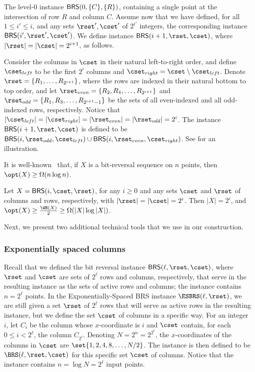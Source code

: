 The level-$0$  instance ${\sf BRS}(0,\{C\}, \{R\})$, containing a single point at the intersection of row $R$ and column $C$. 
Assume now that we have defined, for all $1\leq i'\leq i$, and any sets $\rset',\cset'$ of $2^{i'}$ integers, the corresponding instance ${\sf BRS}(i',\rset',\cset')$. We define  instance ${\sf BRS}(i+1,\rset,\cset)$, where $|\rset| = |\cset| = 2^{i+1}$, as follows. 

Consider the columns in $\cset$ in their natural left-to-right order, and define $\cset_{left}$ to be the first $2^i$ columns and $\cset_{right} = \cset \setminus \cset_{left}$. 
Denote $\rset= \{R_1,\ldots, R_{2^{i+1}}\}$, where the rows are indexed in their natural bottom to top order, and let $\rset_{even}=\{R_2,R_4,\ldots, R_{2^{i+1}}\}$ and $\rset_{odd}=\{R_1,R_3,\ldots, R_{2^{i+1}-1}\}$ be the sets of all even-indexed and all odd-indexed rows, respectively.
Notice that $|\cset_{left}| = |\cset_{right}| = |\rset_{even}| = |\rset_{odd}| = 2^i$. 
The instance ${\sf BRS}(i+1, \rset,\cset)$ is defined to be ${\sf BRS}(i,\rset_{odd},\cset_{left}) \cup {\sf BRS}(i,\rset_{even}, \cset_{right})$. 
See  for an illustration. 

%




It is well-known~\cite{wilber} that, if $X$ is a bit-reversal sequence on $n$ points, then $\opt(X)\geq \Omega(n \log n)$. 

\begin{claim}
\label{claim:BRS complexity} 
Let $X= {\sf BRS}(i,\cset,\rset)$, for any $i\geq 0$ and any sets $\cset$ and $\rset$ of columns and rows, respectively, with $|\rset|=|\cset|=2^i$. Then $|X| = 2^i$, and $\opt(X) \geq \frac{\WB(X)}{2} \geq \Omega(|X| \log |X|)$.  
\end{claim} 



%
%
%
%
%
%
%
%
%
Next, we present two additional technical tools that we use in our construction. 
 

\subsubsection{Exponentially spaced columns}


Recall that we defined the bit reversal instance ${\sf BRS}(\ell, \rset, \cset)$, where $\rset$ and $\cset$ are sets of $2^{\ell}$ rows and columns, respectively, that serve in the resulting instance as the sets of active rows and columns; the instance contains $n=2^{\ell}$ points. 
In the Exponentially-Spaced BRS instance $\ESBRS(\ell,\rset)$, we are still given a set $\rset$ of $2^{\ell}$ rows that will serve as active rows in the resulting instance, but we define the set $\cset$ of columns in a specific way. For an integer $i$, let $C_i$ be the column whose $x$-coordinate is $i$ and $\cset$ contain, for each $0\leq  i< 2^{\ell}$, the column $C_{2^i}$. Denoting $N=2^n=2^{2^{\ell}}$, the $x$-coordinates of the columns in $\cset$ are $\set{1,2,4,8,\ldots,N/2}$. 
The instance is then defined to be $\BRS(\ell,\rset,\cset)$ for this specific set $\cset$ of columns.
Notice that the instance contains $n= \log N=  2^{\ell}$ input points.  

